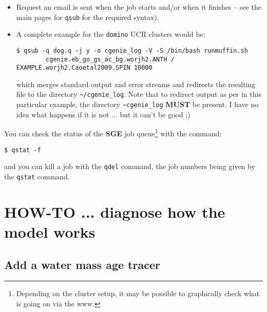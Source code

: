 \documentclass[11pt,fleqn]{book} %
\begin{document}
\begin{itemize}[noitemsep]
        \item Request an email is sent when the job starts and/or when it finishes -- see the main pages for \texttt{qsub} for the required syntax).

        \item A complete example for the \texttt{domino} UCR clusters would be:
\small
        \vspace{-2pt}\begin{verbatim}$ qsub -q dog.q -j y -o cgenie_log -V -S /bin/bash runmuffin.sh
        cgenie.eb_go_gs_ac_bg.worjh2.ANTH / EXAMPLE.worjh2.Caoetal2009.SPIN 10000\end{verbatim}
\normalsize
        which merges standard output and error streams and redirects the resulting file to the directory \texttt{\~{}/cgenie\_log}.
        Note that to redirect output as per in this particular example, the directory \texttt{\~{}cgenie\_log} \textbf{MUST} be present. I have no idea what happens if it is not ... but it can't be good ;)

\end{itemize}

\noindent You can check the status of the \textbf{SGE} job queue\footnote{Depending on the cluster setup, it may be possible to graphically check what is going on via the www.} with the command:
\vspace{-2pt}\begin{verbatim}$ qstat -f\end{verbatim}\vspace{-2pt}
and you can kill a job with the \texttt{qdel} command, the job numbers being given by the \texttt{qstat} command.



\newpage


\section{HOW-TO ... diagnose how the model works}
\vspace{2mm}

%
\subsection*{Add a water mass age tracer}
\vspace{1mm}
\end{document}
